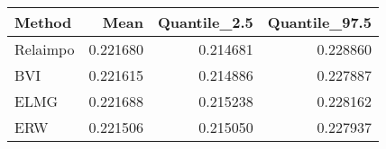 \begin{table}[ht]
\centering
\begin{tabular}{lrrr}
  \hline
Method & Mean & Quantile\_2.5 & Quantile\_97.5 \\ 
  \hline
Relaimpo & 0.221680 & 0.214681 & 0.228860 \\ 
  BVI & 0.221615 & 0.214886 & 0.227887 \\ 
  ELMG & 0.221688 & 0.215238 & 0.228162 \\ 
  ERW & 0.221506 & 0.215050 & 0.227937 \\ 
   \hline
\end{tabular}
\end{table}
